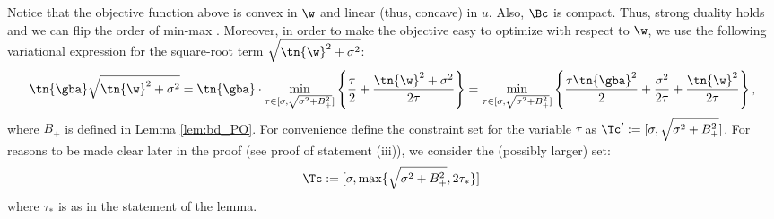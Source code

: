  Notice that the objective function above is convex in $\w$ and linear (thus, concave) in $u$. Also, $\Bc$ is compact. Thus, strong duality holds and we can flip the order of min-max \cite{fan1953minimax}. Moreover, in order to make the objective easy to optimize with respect to $\w$, we use the following variational expression for the square-root term $\sqrt{\tn{\w}^2+\sigma^2}$:
$$
\tn{\gba}\sqrt{\tn{\w}^2+\sigma^2} = \tn{\gba}\cdot\min_{\tau\in[\sigma,\sqrt{\sigma^2+B_+^2}]} \left\{ \frac{\tau}{2} + \frac{\tn{\w}^2+\sigma^2}{2\tau} \right\} = \min_{\tau\in[\sigma,\sqrt{\sigma^2+B_+^2}]} \left\{ \frac{\tau\tn{\gba}^2}{2} + \frac{\sigma^2}{2\tau} + \frac{\tn{\w}^2}{2\tau} \right\},
$$
where $B_+$ is defined in Lemma \ref{lem:bd_PO}. For convenience define the constraint set for the variable $\tau$ as $\Tc':=[\sigma,\sqrt{\sigma^2+B_+^2}]$. For reasons to be made clear later in the proof (see proof of statement (iii)), we consider the (possibly larger) set:
\[
\Tc:=[\sigma,\max\{\sqrt{\sigma^2+B_+^2},2\tau_*\}]\,
\]
where $\tau_*$ is as in the statement of the lemma.

